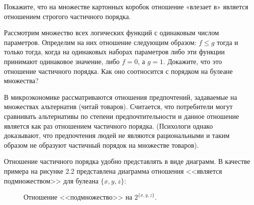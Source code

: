 \begin{exercise}
Покажите, что на множестве картонных коробок отношение «влезает в» является отношением строгого частичного порядка.
\end{exercise}

\begin{exercise}
Рассмотрим множество всех логических функций с одинаковым числом параметров. Определим на них отношение следующим образом: $f\le g$ тогда и только тогда, когда на одинаковых наборах параметров либо эти функции принимают одинаковое значение, либо $f=0$, а $g=1$. Докажите, что это отношение частичного порядка. Как оно соотносится с порядком на булеане множества?
\end{exercise}

\begin{example}
В микроэкономике рассматриваются отношения предпочтений, задаваемые на множествах альтернатив (читай товаров). Считается, что потребители могут сравнивать альтернативы по степени предпочтительности и данное отношение является как раз отношением частичного порядка. (Психологи однако доказывают, что предпочтения людей не являются рациональными и таким образом не образуют частичный порядок на множестве товаров).
\end{example}

Отношение частичного порядка удобно представлять в виде диаграмм. В качестве примера на рисунке 2.2 представлена диаграмма отношения <<является подмножеством>> для булеана $\{x, y, z\}$:

\begin{figure}[h]
\centering
{}
\caption{Отношение <<подмножество>> на $2^{\{x, y, z\}}$.}
\end{figure}

